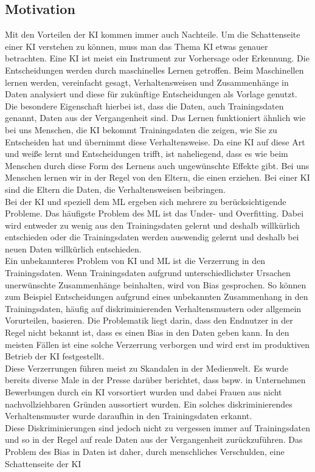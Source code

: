 \begin{onehalfspace}
    \newpage
    \section{Motivation}
    \label{subsec:motivation}
        Mit den Vorteilen der \ac*{KI} kommen immer auch Nachteile. Um die Schattenseite einer \ac*{KI} verstehen zu können, muss man das Thema \ac*{KI} etwas genauer betrachten. Eine \ac*{KI} ist meist ein Instrument zur Vorhersage oder Erkennung. Die Entscheidungen werden durch maschinelles Lernen getroffen. Beim Maschinellen lernen werden, vereinfacht gesagt, Verhaltensweisen und Zusammenhänge in Daten analysiert und diese für zukünftige Entscheidungen als Vorlage genutzt. Die besondere Eigenschaft hierbei ist, dass die Daten, auch Trainingsdaten genannt, Daten aus der Vergangenheit sind. Das Lernen funktioniert ähnlich wie bei uns Menschen, die \ac*{KI} bekommt Trainingsdaten die zeigen, wie Sie zu Entscheiden hat und übernimmt diese Verhaltensweise. Da eine \ac*{KI} auf diese Art und weiße lernt und Entscheidungen trifft, ist naheliegend, dass es wie beim Menschen durch diese Form des Lernens auch ungewünschte Effekte gibt. Bei uns Menschen lernen wir in der Regel von den Eltern, die einen erziehen. Bei einer \ac*{KI} sind die Eltern die Daten, die Verhaltensweisen beibringen.\cite{Döbel2018}
        \\
        Bei der \ac*{KI} und speziell dem \ac{ML} ergeben sich mehrere zu berücksichtigende Probleme. Das häufigste Problem des \ac*{ML} ist das Under- und Overfitting. Dabei wird entweder zu wenig aus den Trainingsdaten gelernt und deshalb willkürlich entschieden oder die Trainingsdaten werden \glqq{}auswendig\grqq{} gelernt und deshalb bei neuen Daten willkürlich entschieden.\cite{Horn2022}
        \\
        Ein unbekannteres Problem von \ac*{KI} und \ac*{ML} ist die Verzerrung in den Trainingsdaten. Wenn Trainingsdaten aufgrund unterschiedlichster Ursachen unerwünschte Zusammenhänge beinhalten, wird von Bias gesprochen. So können zum Beispiel Entscheidungen aufgrund eines unbekannten Zusammenhang in den Trainingsdaten, häufig auf diskriminierenden Verhaltensmustern oder allgemein Vorurteilen, basieren. Die Problematik liegt darin, dass den Endnutzer in der Regel nicht bekannt ist, dass es einen Bias in den Daten geben kann. In den meisten Fällen ist eine solche Verzerrung verborgen und wird erst im produktiven Betrieb der \ac*{KI} festgestellt.\cite{Horn2022}
        \\
        Diese Verzerrungen führen meist zu Skandalen in der Medienwelt. Es wurde bereits diverse Male in der Presse darüber berichtet, dass bspw. in Unternehmen Bewerbungen durch ein \ac*{KI} vorsortiert wurden und dabei Frauen aus nicht nachvollziehbaren Gründen aussortiert wurden. Ein solches diskriminierendes Verhaltensmuster wurde daraufhin in den Trainingsdaten erkannt.\cite{IncidentDatabase2015_37}
        \\
        Diese Diskriminierungen sind jedoch nicht zu vergessen immer auf Trainingsdaten und so in der Regel auf reale Daten aus der Vergangenheit zurückzuführen. Das Problem des Bias in Daten ist daher, durch menschliches Verschulden, eine Schattenseite der \ac*{KI} 


\end{onehalfspace}
